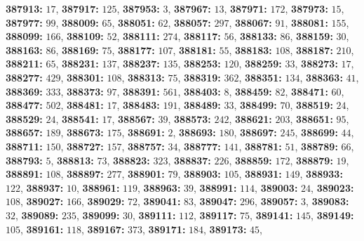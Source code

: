 \textsf{\bfseries 387913:} $17$, \textsf{\bfseries 387917:} $125$, \textsf{\bfseries 387953:} $3$, \textsf{\bfseries 387967:} $13$, \textsf{\bfseries 387971:} $172$, \textsf{\bfseries 387973:} $15$, \textsf{\bfseries 387977:} $99$, \textsf{\bfseries 388009:} $65$, \textsf{\bfseries 388051:} $62$, \textsf{\bfseries 388057:} $297$, \textsf{\bfseries 388067:} $91$, \textsf{\bfseries 388081:} $155$, \textsf{\bfseries 388099:} $166$, \textsf{\bfseries 388109:} $52$, \textsf{\bfseries 388111:} $274$, \textsf{\bfseries 388117:} $56$, \textsf{\bfseries 388133:} $86$, \textsf{\bfseries 388159:} $30$, \textsf{\bfseries 388163:} $86$, \textsf{\bfseries 388169:} $75$, \textsf{\bfseries 388177:} $107$, \textsf{\bfseries 388181:} $55$, \textsf{\bfseries 388183:} $108$, \textsf{\bfseries 388187:} $210$, \textsf{\bfseries 388211:} $65$, \textsf{\bfseries 388231:} $137$, \textsf{\bfseries 388237:} $135$, \textsf{\bfseries 388253:} $120$, \textsf{\bfseries 388259:} $33$, \textsf{\bfseries 388273:} $17$, \textsf{\bfseries 388277:} $429$, \textsf{\bfseries 388301:} $108$, \textsf{\bfseries 388313:} $75$, \textsf{\bfseries 388319:} $362$, \textsf{\bfseries 388351:} $134$, \textsf{\bfseries 388363:} $41$, \textsf{\bfseries 388369:} $333$, \textsf{\bfseries 388373:} $97$, \textsf{\bfseries 388391:} $561$, \textsf{\bfseries 388403:} $8$, \textsf{\bfseries 388459:} $82$, \textsf{\bfseries 388471:} $60$, \textsf{\bfseries 388477:} $502$, \textsf{\bfseries 388481:} $17$, \textsf{\bfseries 388483:} $191$, \textsf{\bfseries 388489:} $33$, \textsf{\bfseries 388499:} $70$, \textsf{\bfseries 388519:} $24$, \textsf{\bfseries 388529:} $24$, \textsf{\bfseries 388541:} $17$, \textsf{\bfseries 388567:} $39$, \textsf{\bfseries 388573:} $242$, \textsf{\bfseries 388621:} $203$, \textsf{\bfseries 388651:} $95$, \textsf{\bfseries 388657:} $189$, \textsf{\bfseries 388673:} $175$, \textsf{\bfseries 388691:} $2$, \textsf{\bfseries 388693:} $180$, \textsf{\bfseries 388697:} $245$, \textsf{\bfseries 388699:} $44$, \textsf{\bfseries 388711:} $150$, \textsf{\bfseries 388727:} $157$, \textsf{\bfseries 388757:} $34$, \textsf{\bfseries 388777:} $141$, \textsf{\bfseries 388781:} $51$, \textsf{\bfseries 388789:} $66$, \textsf{\bfseries 388793:} $5$, \textsf{\bfseries 388813:} $73$, \textsf{\bfseries 388823:} $323$, \textsf{\bfseries 388837:} $226$, \textsf{\bfseries 388859:} $172$, \textsf{\bfseries 388879:} $19$, \textsf{\bfseries 388891:} $108$, \textsf{\bfseries 388897:} $277$, \textsf{\bfseries 388901:} $79$, \textsf{\bfseries 388903:} $105$, \textsf{\bfseries 388931:} $149$, \textsf{\bfseries 388933:} $122$, \textsf{\bfseries 388937:} $10$, \textsf{\bfseries 388961:} $119$, \textsf{\bfseries 388963:} $39$, \textsf{\bfseries 388991:} $114$, \textsf{\bfseries 389003:} $24$, \textsf{\bfseries 389023:} $108$, \textsf{\bfseries 389027:} $166$, \textsf{\bfseries 389029:} $72$, \textsf{\bfseries 389041:} $83$, \textsf{\bfseries 389047:} $296$, \textsf{\bfseries 389057:} $3$, \textsf{\bfseries 389083:} $32$, \textsf{\bfseries 389089:} $235$, \textsf{\bfseries 389099:} $30$, \textsf{\bfseries 389111:} $112$, \textsf{\bfseries 389117:} $75$, \textsf{\bfseries 389141:} $145$, \textsf{\bfseries 389149:} $105$, \textsf{\bfseries 389161:} $118$, \textsf{\bfseries 389167:} $373$, \textsf{\bfseries 389171:} $184$, \textsf{\bfseries 389173:} $45$, 
